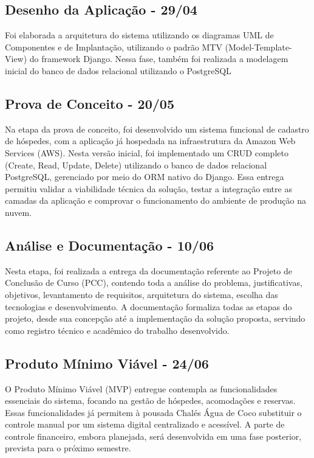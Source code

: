 \documentclass[
	12pt,				%
	openany,			%
	oneside,			%
	a4paper,			%
	english,			%
	french,				%
	spanish,			%
	brazil				%
	]{abntex2}
\begin{document}
\subsection{Desenho da Aplicação - 29/04}

Foi elaborada a arquitetura do sistema utilizando os diagramas UML de Componentes e de Implantação, utilizando o padrão MTV (Model-Template-View) do framework Django. Nessa fase, também foi realizada a modelagem inicial do banco de dados relacional utilizando o PostgreSQL

\subsection{Prova de Conceito - 20/05}

Na etapa da prova de conceito, foi desenvolvido um sistema funcional de cadastro de hóspedes, com a aplicação já hospedada na infraestrutura da Amazon Web Services (AWS). Nesta versão inicial, foi implementado um CRUD completo (Create, Read, Update, Delete) utilizando o banco de dados relacional PostgreSQL, gerenciado por meio do ORM nativo do Django. Essa entrega permitiu validar a viabilidade técnica da solução, testar a integração entre as camadas da aplicação e comprovar o funcionamento do ambiente de produção na nuvem.

\subsection{Análise e Documentação - 10/06}

Nesta etapa, foi realizada a entrega da documentação referente ao Projeto de Conclusão de Curso (PCC), contendo toda a análise do problema, justificativas, objetivos, levantamento de requisitos, arquitetura do sistema, escolha das tecnologias e desenvolvimento. A documentação formaliza todas as etapas do projeto, desde sua concepção até a implementação da solução proposta, servindo como registro técnico e acadêmico do trabalho desenvolvido.

\subsection{Produto Mínimo Viável - 24/06}

O Produto Mínimo Viável (MVP) entregue contempla as funcionalidades essenciais do sistema, focando na gestão de hóspedes, acomodações e reservas. Essas funcionalidades já permitem à pousada Chalés Água de Coco substituir o controle manual por um sistema digital centralizado e acessível. A parte de controle financeiro, embora planejada, será desenvolvida em uma fase posterior, prevista para o próximo semestre.
\end{document}
